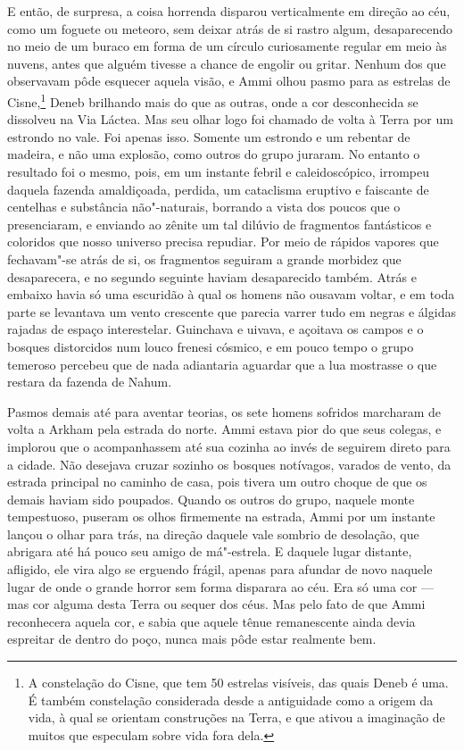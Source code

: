 E então, de surpresa, a coisa horrenda disparou verticalmente em direção
ao céu, como um foguete ou meteoro, sem deixar atrás de si rastro algum,
desaparecendo no meio de um buraco em forma de um círculo curiosamente
regular em meio às nuvens, antes que alguém tivesse a chance de engolir
ou gritar. Nenhum dos que observavam pôde esquecer aquela visão, e Ammi
olhou pasmo para as estrelas de Cisne,\footnote{A constelação do Cisne,
  que tem 50 estrelas visíveis, das quais Deneb é uma. É também
  constelação considerada desde a antiguidade como a origem da vida, à
  qual se orientam construções na Terra, e que ativou a imaginação de
  muitos que especulam sobre vida fora dela.} Deneb brilhando mais do
que as outras, onde a cor desconhecida se dissolveu na Via Láctea. Mas
seu olhar logo foi chamado de volta à Terra por um estrondo no vale. Foi
apenas isso. Somente um estrondo e um rebentar de madeira, e não uma
explosão, como outros do grupo juraram. No entanto o resultado foi o
mesmo, pois, em um instante febril e caleidoscópico, irrompeu daquela
fazenda amaldiçoada, perdida, um cataclisma eruptivo e faiscante de
centelhas e substância não"-naturais, borrando a vista dos poucos que o
presenciaram, e enviando ao zênite um tal dilúvio de fragmentos
fantásticos e coloridos que nosso universo precisa repudiar. Por meio de
rápidos vapores que fechavam"-se atrás de si, os fragmentos seguiram a
grande morbidez que desaparecera, e no segundo seguinte haviam
desaparecido também. Atrás e embaixo havia só uma escuridão à qual os
homens não ousavam voltar, e em toda parte se levantava um vento
crescente que parecia varrer tudo em negras e álgidas rajadas de espaço
interestelar. Guinchava e uivava, e açoitava os campos e o bosques
distorcidos num louco frenesi cósmico, e em pouco tempo o grupo temeroso
percebeu que de nada adiantaria aguardar que a lua mostrasse o que
restara da fazenda de Nahum.

Pasmos demais até para aventar teorias, os sete homens sofridos
marcharam de volta a Arkham pela estrada do norte. Ammi estava pior do
que seus colegas, e implorou que o acompanhassem até sua cozinha ao
invés de seguirem direto para a cidade. Não desejava cruzar sozinho os
bosques notívagos, varados de vento, da estrada principal no caminho de
casa, pois tivera um outro choque de que os demais haviam sido poupados.
Quando os outros do grupo, naquele monte tempestuoso, puseram os olhos
firmemente na estrada, Ammi por um instante lançou o olhar para trás, na
direção daquele vale sombrio de desolação, que abrigara até há pouco seu
amigo de má"-estrela. E daquele lugar distante, afligido, ele vira algo
se erguendo frágil, apenas para afundar de novo naquele lugar de onde o
grande horror sem forma disparara ao céu. Era só uma cor --- mas cor
alguma desta Terra ou sequer dos céus. Mas pelo fato de que Ammi
reconhecera aquela cor, e sabia que aquele tênue remanescente ainda
devia espreitar de dentro do poço, nunca mais pôde estar realmente bem.

